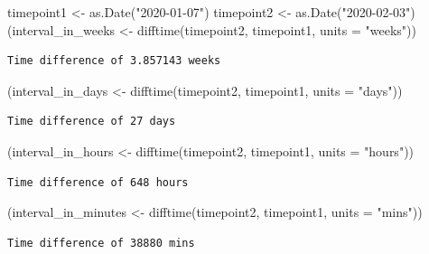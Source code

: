 \documentclass[
]{book}
\newenvironment{Shaded}{\begin{snugshade}}{\end{snugshade}}
\newcommand{\AttributeTok}[1]{\textcolor[rgb]{0.77,0.63,0.00}{#1}}
\newcommand{\FunctionTok}[1]{\textcolor[rgb]{0.00,0.00,0.00}{#1}}
\newcommand{\NormalTok}[1]{#1}
\newcommand{\OtherTok}[1]{\textcolor[rgb]{0.56,0.35,0.01}{#1}}
\newcommand{\StringTok}[1]{\textcolor[rgb]{0.31,0.60,0.02}{#1}}
\begin{document}
\begin{Shaded}
\begin{Highlighting}[]
\NormalTok{timepoint1 }\OtherTok{\textless{}{-}} \FunctionTok{as.Date}\NormalTok{(}\StringTok{"2020{-}01{-}07"}\NormalTok{)}
\NormalTok{timepoint2 }\OtherTok{\textless{}{-}} \FunctionTok{as.Date}\NormalTok{(}\StringTok{"2020{-}02{-}03"}\NormalTok{)}
\NormalTok{(interval\_in\_weeks }\OtherTok{\textless{}{-}} \FunctionTok{difftime}\NormalTok{(timepoint2, timepoint1, }\AttributeTok{units =} \StringTok{"weeks"}\NormalTok{))}
\end{Highlighting}
\end{Shaded}

\begin{verbatim}
Time difference of 3.857143 weeks
\end{verbatim}

\begin{Shaded}
\begin{Highlighting}[]
\NormalTok{(interval\_in\_days }\OtherTok{\textless{}{-}} \FunctionTok{difftime}\NormalTok{(timepoint2, timepoint1, }\AttributeTok{units =} \StringTok{"days"}\NormalTok{))}
\end{Highlighting}
\end{Shaded}

\begin{verbatim}
Time difference of 27 days
\end{verbatim}

\begin{Shaded}
\begin{Highlighting}[]
\NormalTok{(interval\_in\_hours }\OtherTok{\textless{}{-}} \FunctionTok{difftime}\NormalTok{(timepoint2, timepoint1, }\AttributeTok{units =} \StringTok{"hours"}\NormalTok{))}
\end{Highlighting}
\end{Shaded}

\begin{verbatim}
Time difference of 648 hours
\end{verbatim}

\begin{Shaded}
\begin{Highlighting}[]
\NormalTok{(interval\_in\_minutes }\OtherTok{\textless{}{-}} \FunctionTok{difftime}\NormalTok{(timepoint2, timepoint1, }\AttributeTok{units =} \StringTok{"mins"}\NormalTok{))}
\end{Highlighting}
\end{Shaded}

\begin{verbatim}
Time difference of 38880 mins
\end{verbatim}
\end{document}
